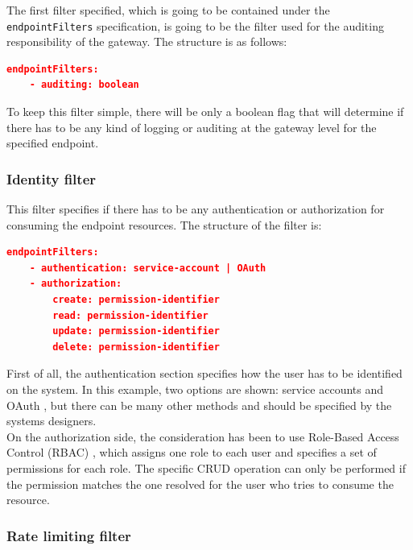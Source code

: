 \documentclass[english, 12pt, a4paper, sci, utf8, a-1b, online]{aaltothesis}
\begin{document}
The first filter specified, which is going to be contained under the \texttt{endpointFilters} specification, is going to be the filter used for the auditing responsibility of the gateway. The structure is as follows:\\

\begin{lstlisting}[language=json,firstnumber=1]
  endpointFilters:
    - auditing: boolean
\end{lstlisting}

To keep this filter simple, there will be only a boolean flag that will determine if there has to be any kind of logging or auditing at the gateway level for the specified endpoint.

\subsubsection*{Identity filter}

This filter specifies if there has to be any authentication or authorization for consuming the endpoint resources. The structure of the filter is:\\

\begin{lstlisting}[language=json,firstnumber=1]
  endpointFilters:
    - authentication: service-account | OAuth
    - authorization:
	    create: permission-identifier
	    read: permission-identifier
	    update: permission-identifier
	    delete: permission-identifier
\end{lstlisting}

First of all, the authentication section specifies how the user has to be identified on the system. In this example, two options are shown: service accounts and OAuth \cite{OAuth2}, but there can be many other methods and should be specified by the systems designers.\\

On the authorization side, the consideration has been to use Role-Based Access Control (RBAC) \cite{ferraiolo2003role}, which assigns one role to each user and specifies a set of permissions for each role. The specific CRUD operation can only be performed if the permission matches the one resolved for the user who tries to consume the resource.

\subsubsection*{Rate limiting filter}
\end{document}
